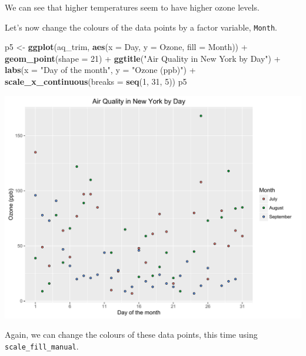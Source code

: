 \documentclass[]{article}
\newenvironment{Shaded}{\begin{snugshade}}{\end{snugshade}}
\newcommand{\KeywordTok}[1]{\textcolor[rgb]{0.13,0.29,0.53}{\textbf{{#1}}}}
\newcommand{\DataTypeTok}[1]{\textcolor[rgb]{0.13,0.29,0.53}{{#1}}}
\newcommand{\DecValTok}[1]{\textcolor[rgb]{0.00,0.00,0.81}{{#1}}}
\newcommand{\StringTok}[1]{\textcolor[rgb]{0.31,0.60,0.02}{{#1}}}
\newcommand{\NormalTok}[1]{{#1}}
\begin{document}
We can see that higher temperatures seem to have higher ozone levels.

Let's now change the colours of the data points by a factor variable,
\texttt{Month}.

\begin{Shaded}
\begin{Highlighting}[]
\NormalTok{p5 <-}\StringTok{ }\KeywordTok{ggplot}\NormalTok{(aq_trim, }\KeywordTok{aes}\NormalTok{(}\DataTypeTok{x =} \NormalTok{Day, }\DataTypeTok{y =} \NormalTok{Ozone, }\DataTypeTok{fill =} \NormalTok{Month)) +}\StringTok{ }
\StringTok{      }\KeywordTok{geom_point}\NormalTok{(}\DataTypeTok{shape =} \DecValTok{21}\NormalTok{) +}
\StringTok{      }\KeywordTok{ggtitle}\NormalTok{(}\StringTok{"Air Quality in New York by Day"}\NormalTok{) +}\StringTok{ }
\StringTok{      }\KeywordTok{labs}\NormalTok{(}\DataTypeTok{x =} \StringTok{"Day of the month"}\NormalTok{, }\DataTypeTok{y =} \StringTok{"Ozone (ppb)"}\NormalTok{) +}
\StringTok{      }\KeywordTok{scale_x_continuous}\NormalTok{(}\DataTypeTok{breaks =} \KeywordTok{seq}\NormalTok{(}\DecValTok{1}\NormalTok{, }\DecValTok{31}\NormalTok{, }\DecValTok{5}\NormalTok{))}
\NormalTok{p5}
\end{Highlighting}
\end{Shaded}

\begin{center}\includegraphics{0_all_posts_pdf/scatter_9-1} \end{center}

Again, we can change the colours of these data points, this time using
\texttt{scale\_fill\_manual}.
\end{document}
